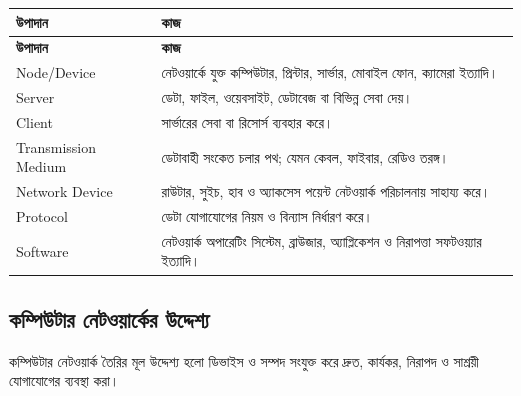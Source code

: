 \begingroup
\begin{longtable}{|p{}|p{}|}
\hline
\textbf{উপাদান} & \textbf{কাজ} \\
\hline
\endfirsthead
\hline
\textbf{উপাদান} & \textbf{কাজ} \\
\hline
\endhead

Node/Device & নেটওয়ার্কে যুক্ত কম্পিউটার, প্রিন্টার, সার্ভার, মোবাইল ফোন, ক্যামেরা ইত্যাদি। \\
\hline
Server & ডেটা, ফাইল, ওয়েবসাইট, ডেটাবেজ বা বিভিন্ন সেবা দেয়। \\
\hline
Client & সার্ভারের সেবা বা রিসোর্স ব্যবহার করে। \\
\hline
Transmission Medium & ডেটাবাহী সংকেত চলার পথ; যেমন কেবল, ফাইবার, রেডিও তরঙ্গ। \\
\hline
Network Device & রাউটার, সুইচ, হাব ও অ্যাকসেস পয়েন্ট নেটওয়ার্ক পরিচালনায় সাহায্য করে। \\
\hline
Protocol & ডেটা যোগাযোগের নিয়ম ও বিন্যাস নির্ধারণ করে। \\
\hline
Software & নেটওয়ার্ক অপারেটিং সিস্টেম, ব্রাউজার, অ্যাপ্লিকেশন ও নিরাপত্তা সফটওয়্যার ইত্যাদি। \\
\hline
\end{longtable}
\endgroup

\subsection{কম্পিউটার নেটওয়ার্কের উদ্দেশ্য}

কম্পিউটার নেটওয়ার্ক তৈরির মূল উদ্দেশ্য হলো ডিভাইস ও সম্পদ সংযুক্ত করে দ্রুত, কার্যকর, নিরাপদ ও সাশ্রয়ী যোগাযোগের ব্যবস্থা করা।




